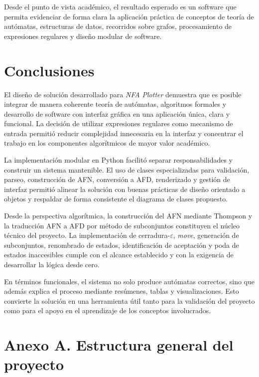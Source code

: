 \documentclass[12pt]{article}
\begin{document}
Desde el punto de vista académico, el resultado esperado es un software que permita evidenciar de forma clara la aplicación práctica de conceptos de teoría de autómatas, estructuras de datos, recorridos sobre grafos, procesamiento de expresiones regulares y diseño modular de software.

\section{Conclusiones}

El diseño de solución desarrollado para \textit{NFA Plotter} demuestra que es posible integrar de manera coherente teoría de autómatas, algoritmos formales y desarrollo de software con interfaz gráfica en una aplicación única, clara y funcional. La decisión de utilizar expresiones regulares como mecanismo de entrada permitió reducir complejidad innecesaria en la interfaz y concentrar el trabajo en los componentes algorítmicos de mayor valor académico.

La implementación modular en Python facilitó separar responsabilidades y construir un sistema mantenible. El uso de clases especializadas para validación, parseo, construcción de AFN, conversión a AFD, renderizado y gestión de interfaz permitió alinear la solución con buenas prácticas de diseño orientado a objetos y respaldar de forma consistente el diagrama de clases propuesto.

Desde la perspectiva algorítmica, la construcción del AFN mediante Thompson y la traducción AFN a AFD por método de subconjuntos constituyen el núcleo técnico del proyecto. La implementación de cerradura-$\varepsilon$, \textit{move}, generación de subconjuntos, renombrado de estados, identificación de aceptación y poda de estados inaccesibles cumple con el alcance establecido y con la exigencia de desarrollar la lógica desde cero.

En términos funcionales, el sistema no solo produce autómatas correctos, sino que además explica el proceso mediante resúmenes, tablas y visualizaciones. Esto convierte la solución en una herramienta útil tanto para la validación del proyecto como para el apoyo en el aprendizaje de los conceptos involucrados.

\section{Anexo A. Estructura general del proyecto}
\end{document}
